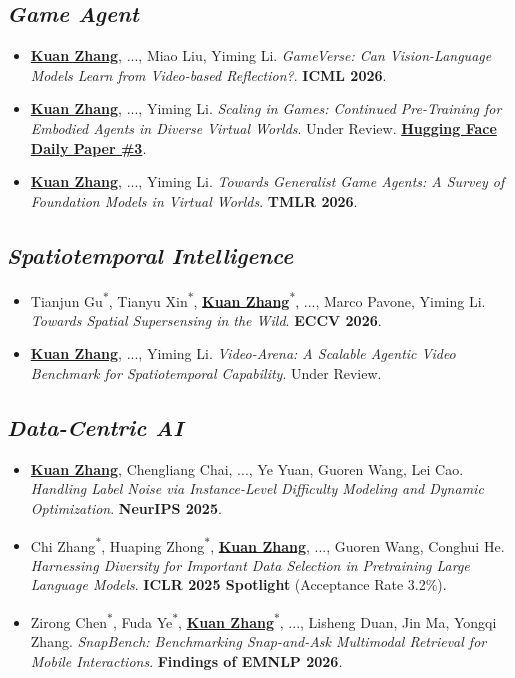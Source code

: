 \documentclass{resume}
\newcommand{\self}{\underline{\textbf{Kuan Zhang}}}
\newcommand{\equalcontrib}{\textsuperscript{$\ast$}}
\begin{document}
\subsection{\textit{Game Agent}}
\begin{itemize}[parsep=0.7ex]
  \item \self, ..., Miao Liu, Yiming Li. \textit{GameVerse: Can Vision-Language Models Learn from Video-based Reflection?}. \textbf{ICML 2026}.
  \item \self, ..., Yiming Li. \textit{Scaling in Games: Continued Pre-Training for Embodied Agents in Diverse Virtual Worlds}. Under Review. \href{https://huggingface.co/papers/2610.28698}{\textbf{Hugging Face Daily Paper \#3}}.
  \item \self, ..., Yiming Li. \textit{Towards Generalist Game Agents: A Survey of Foundation Models in Virtual Worlds}. \textbf{TMLR 2026}.
\end{itemize}
\subsection{\textit{Spatiotemporal Intelligence}}
\begin{itemize}[parsep=0.7ex]
  \item Tianjun Gu\equalcontrib, Tianyu Xin\equalcontrib, \self\equalcontrib, ..., Marco Pavone, Yiming Li. \textit{Towards Spatial Supersensing in the Wild}. \textbf{ECCV 2026}.
  \item \self, ..., Yiming Li. \textit{Video-Arena: A Scalable Agentic Video Benchmark for Spatiotemporal Capability}. Under Review.
\end{itemize}
\subsection{\textit{Data-Centric AI}}
\begin{itemize}[parsep=0.7ex]
  \item \self, Chengliang Chai, ..., Ye Yuan, Guoren Wang, Lei Cao. \textit{Handling Label Noise via Instance-Level Difficulty Modeling and Dynamic Optimization}. \textbf{NeurIPS 2025}.
  \item Chi Zhang\equalcontrib, Huaping Zhong\equalcontrib, \self, ..., Guoren Wang, Conghui He. \textit{Harnessing Diversity for Important Data Selection in Pretraining Large Language Models}. \textbf{ICLR 2025 Spotlight} (Acceptance Rate 3.2\%).
  \item Zirong Chen\equalcontrib, Fuda Ye\equalcontrib, \self\equalcontrib, ..., Lisheng Duan, Jin Ma, Yongqi Zhang. \textit{SnapBench: Benchmarking Snap-and-Ask Multimodal Retrieval for Mobile Interactions}. \textbf{Findings of EMNLP 2026}.
\end{itemize}
\end{document}
